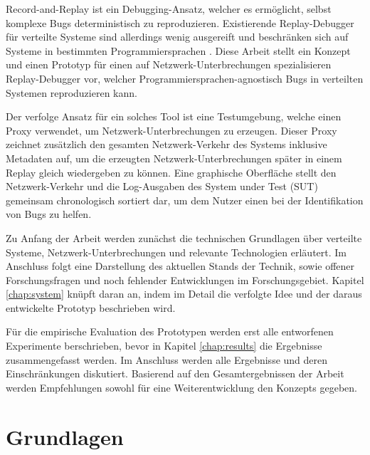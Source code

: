 \documentclass[12pt,a4paper]{report}
\begin{document}

Record-and-Replay ist ein Debugging-Ansatz, welcher es ermöglicht, selbst komplexe Bugs deterministisch zu reproduzieren.
Existierende Replay-Debugger für verteilte Systeme sind allerdings wenig ausgereift und beschränken sich auf Systeme in bestimmten
Programmiersprachen \cite{distributed_replay_debugging_1997,distributed_replay_debugging_2006}. Diese Arbeit stellt ein Konzept
und einen Prototyp für einen auf Netzwerk-Unterbrechungen spezialisieren Replay-Debugger vor, welcher
Programmiersprachen-agnostisch Bugs in verteilten Systemen reproduzieren kann.


Der verfolge Ansatz für ein solches Tool ist eine Testumgebung, welche einen Proxy verwendet, um Netzwerk-Unterbrechungen zu
erzeugen. Dieser Proxy zeichnet zusätzlich den gesamten Netzwerk-Verkehr des Systems inklusive Metadaten auf, um die erzeugten
Netzwerk-Unterbrechungen später in einem Replay gleich wiedergeben zu können. Eine graphische Oberfläche stellt den
Netzwerk-Verkehr und die Log-Ausgaben des System under Test (SUT) gemeinsam chronologisch sortiert dar, um dem Nutzer einen bei
der Identifikation von Bugs zu helfen.

Zu Anfang der Arbeit werden zunächst die technischen Grundlagen über verteilte Systeme, Netzwerk-Unterbrechungen und relevante
Technologien erläutert. Im Anschluss folgt eine Darstellung des aktuellen Stands der Technik, sowie offener Forschungsfragen und
noch fehlender Entwicklungen im Forschungsgebiet. Kapitel \ref{chap:system} knüpft daran an, indem im Detail die verfolgte Idee
und der daraus entwickelte Prototyp beschrieben wird.

Für die empirische Evaluation des Prototypen werden erst alle entworfenen Experimente berschrieben, bevor in Kapitel
\ref{chap:results} die Ergebnisse zusammengefasst werden. Im Anschluss werden alle Ergebnisse und deren Einschränkungen
diskutiert. Basierend auf den Gesamtergebnissen der Arbeit werden Empfehlungen sowohl für eine Weiterentwicklung den Konzepts
gegeben.

\chapter{Grundlagen}
\end{document}
